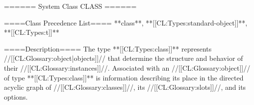====== System Class CLASS ======

====Class Precedence List==== 
**class**, **[[CL:Types:standard-object]]**, **[[CL:Types:t]]**

====Description====
The type **[[CL:Types:class]]** represents //[[CL:Glossary:object|objects]]// that determine the structure and behavior of their //[[CL:Glossary:instances]]//. Associated with an //[[CL:Glossary:object]]// of type **[[CL:Types:class]]** is information describing its place in the directed acyclic graph of //[[CL:Glossary:classes]]//, its //[[CL:Glossary:slots]]//, and its options.

 

